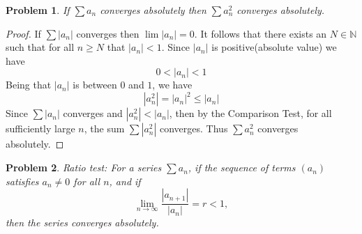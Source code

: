 \documentclass[12pt]{article}
\newtheorem{problem}{Problem}
\newcommand{\NN}{\ensuremath{\mathbb N}}
\begin{document}
\begin{problem} %
If $\sum a_n$ converges absolutely then $\sum a_n^2$ converges absolutely.
\end{problem}

\begin{proof}
If $\sum |a_n|$ converges then $\lim |a_n| = 0$. It follows that there exists an $N \in \NN$ such that for all $n \geq N$ that $|a_n| < 1$. Since 
$|a_n|$ is positive(absolute value) we have
$$0 < |a_n| < 1$$
Being that $|a_n|$ is between $0$ and $1$, we have
$$|a_n^2| = |a_n|^2 \leq |a_n|$$
Since $\sum |a_n|$ converges and $|a_n^2| < |a_n|$, then by the Comparison Test, for all sufficiently large $n$, the sum $\sum |a_n^2|$ converges.
Thus $\sum a_n^2$ converges absolutely.
\end{proof}


\begin{problem} %
Ratio test:  For a series $\sum a_n$, if the sequence of terms $(a_n)$ satisfies $a_n\ne 0$ for all $n$, and if
	$$\lim_{n\to\infty} \frac{|a_{n+1}|}{|a_n|} = r < 1,$$
then the series converges absolutely.
\end{problem}

\end{document}
